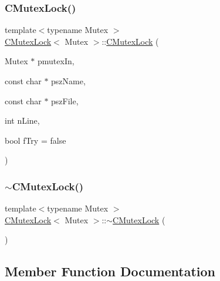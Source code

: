 \mbox{\label{class_c_mutex_lock_a4725b7154d87d0e0eb47c62d299963be}} 
\subsubsection{\texorpdfstring{C\+Mutex\+Lock()}{CMutexLock()}\hspace{0.1cm}{\footnotesize\ttfamily [2/2]}}
{\footnotesize\ttfamily template$<$typename Mutex $>$ \\
\mbox{\hyperlink{class_c_mutex_lock}{C\+Mutex\+Lock}}$<$ Mutex $>$\+::\mbox{\hyperlink{class_c_mutex_lock}{C\+Mutex\+Lock}} (\begin{DoxyParamCaption}\item[{Mutex $\ast$}]{pmutex\+In,  }\item[{const char $\ast$}]{psz\+Name,  }\item[{const char $\ast$}]{psz\+File,  }\item[{int}]{n\+Line,  }\item[{bool}]{f\+Try = {\ttfamily false} }\end{DoxyParamCaption})\hspace{0.3cm}{\ttfamily [inline]}}

\mbox{\label{class_c_mutex_lock_af475e374b70ac03db516d00f65b723b7}} 
\subsubsection{\texorpdfstring{$\sim$\+C\+Mutex\+Lock()}{~CMutexLock()}}
{\footnotesize\ttfamily template$<$typename Mutex $>$ \\
\mbox{\hyperlink{class_c_mutex_lock}{C\+Mutex\+Lock}}$<$ Mutex $>$\+::$\sim$\mbox{\hyperlink{class_c_mutex_lock}{C\+Mutex\+Lock}} (\begin{DoxyParamCaption}{ }\end{DoxyParamCaption})\hspace{0.3cm}{\ttfamily [inline]}}



\subsection{Member Function Documentation}
\mbox{\label{class_c_mutex_lock_a8a9f734c76f1b766445bec41b91393dd}} 
